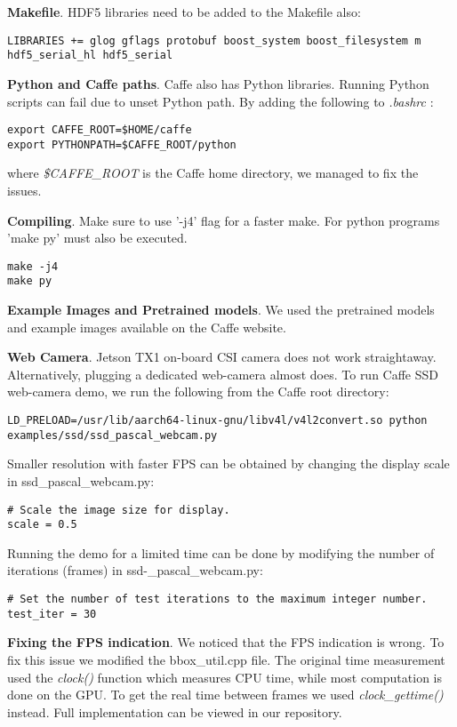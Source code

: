 \textbf{Makefile}.
HDF5 libraries need to be added to the Makefile also:
\begin{lstlisting} 
LIBRARIES += glog gflags protobuf boost_system boost_filesystem m hdf5_serial_hl hdf5_serial
\end{lstlisting}

\textbf{Python and Caffe paths}.
Caffe also has Python libraries. Running Python scripts can fail due to unset Python path. By adding the following to \textit{.bashrc} :
\begin{lstlisting} 
export CAFFE_ROOT=$HOME/caffe
export PYTHONPATH=$CAFFE_ROOT/python
\end{lstlisting}
where \textit{\$CAFFE\_ROOT} is the Caffe home directory, we managed to fix the issues. 

\textbf{Compiling}.
Make sure to use '-j4' flag for a faster make. For python programs 'make py' must also be executed.
\begin{lstlisting} 
make -j4
make py
\end{lstlisting}

\textbf{Example Images and Pretrained models}.
We used the pretrained models and example images available on the Caffe website.

\textbf{Web Camera}.
Jetson TX1 on-board CSI camera does not work straightaway. Alternatively, plugging a dedicated web-camera almost does. To run Caffe SSD web-camera demo, we run the following from the Caffe root directory:
\begin{lstlisting} 
LD_PRELOAD=/usr/lib/aarch64-linux-gnu/libv4l/v4l2convert.so python examples/ssd/ssd_pascal_webcam.py
\end{lstlisting}

Smaller resolution with faster FPS can be obtained by changing the display scale 
in ssd\_pascal\_webcam.py:
\begin{lstlisting} 
# Scale the image size for display.
scale = 0.5
\end{lstlisting}

Running the demo for a limited time can be done by modifying the number of iterations (frames) in ssd-\_pascal\_webcam.py:
\begin{lstlisting} 
# Set the number of test iterations to the maximum integer number.
test_iter = 30 
\end{lstlisting}

\textbf{Fixing the FPS indication}. We noticed that the FPS indication is wrong. To fix this issue we modified the bbox\_util.cpp file. The original time measurement used the \textit{clock()} function which measures CPU time, while most computation is done on the GPU. To get the real time between frames we used \textit{clock\_gettime()} instead. Full implementation can be viewed in our repository.

